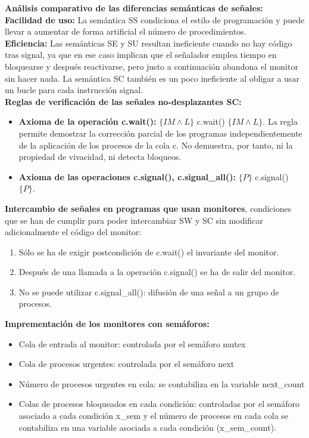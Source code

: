 \documentclass[a4paper,11pt]{article}
\begin{document}
\textbf{Análisis comparativo de las diferencias semánticas de señales:} \\

\textbf{Facilidad de uso:} La semántica SS condiciona el estilo de programación y puede llevar a aumentar de forma artificial el número de procedimientos. \\

\textbf{Eficiencia:} Las semánticas SE y SU resultan ineficiente cuando no hay código tras signal, ya que en ese caso implican que el señalador emplea tiempo en bloquearse y después reactivarse, pero justo a continuación abandona el monitor sin hacer nada. La semántica SC también es un poco ineficiente al obligar a usar un bucle para cada instrucción signal. \\

\textbf{Reglas de verificación de las señales no-desplazantes SC:}

\begin{itemize}
\item \textbf{Axioma de la operación c.wait():} $\{IM \wedge L\}$ c.wait() $\{IM \wedge L\}$. La regla permite demostrar la corrección parcial de los programas independientemente de la aplicación de los procesos de la cola c. No demuestra, por tanto, ni la propiedad de vivacidad, ni detecta bloqueos.

\item \textbf{Axioma de las operaciones c.signal(), c.signal\_all():} $\{P\}$ c.signal() $\{P\}$.
\end{itemize}

\textbf{Intercambio de señales en programas que usan monitores}, condiciones que se han de cumplir para poder intercambiar SW y SC sin modificar adicionalmente el código del monitor:

\begin{enumerate}
\item Sólo se ha de exigir postcondición de c.wait() el invariante del monitor.
\item Después de una llamada a la operación c.signal() se ha de salir del monitor.
\item No se puede utilizar c.signal\_all(): difusión de una señal a un grupo de procesos.
\end{enumerate}

\textbf{Imprementación de los monitores con semáforos:}
\begin{itemize}
\item Cola de entrada al monitor: controlada por el semáforo mutex
\item Cola de procesos urgentes: controlada por el semáforo next
\item Número de procesos urgentes en cola: se contabiliza en la variable next\_count
\item Colas de procesos bloqueados en cada condición: controladas por el semáforo asociado a cada condición x\_sem y el número de procesos en cada cola se contabiliza en una variable asociada a cada condición (x\_sem\_count).
\end{itemize}
\end{document}
